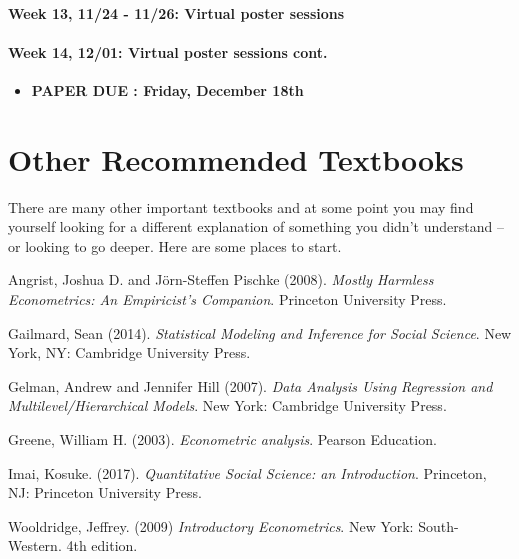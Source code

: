 \documentclass[11pt]{article}
\providecommand{\tightlist}{%
  \setlength{\itemsep}{0pt}\setlength{\parskip}{0pt}}
\begin{document}
\paragraph{Week 13, 11/24 - 11/26: Virtual poster sessions}

\paragraph{Week 14, 12/01: Virtual poster sessions cont.}

\begin{itemize}
\tightlist
    \item 
  \textbf{PAPER DUE : Friday, December 18th}
\end{itemize}

\section*{Other Recommended Textbooks}

There are many other important textbooks and at some point you may find
yourself looking for a different explanation of something you didn't
understand -- or looking to go deeper. Here are some places to start.

Angrist, Joshua D. and Jörn-Steffen Pischke (2008).
\emph{Mostly Harmless Econometrics: An Empiricist's Companion}.
Princeton University Press. 

Gailmard, Sean (2014).
\emph{Statistical Modeling and Inference for Social Science}. New York,
NY: Cambridge University Press.

Gelman, Andrew and Jennifer Hill (2007).
\emph{Data Analysis Using Regression and
Multilevel/Hierarchical Models}. New York: Cambridge University Press.

Greene, William H. (2003). \emph{Econometric analysis}. Pearson
Education.

Imai, Kosuke. (2017). \emph{Quantitative Social Science: an Introduction}. Princeton, NJ: Princeton University Press.

Wooldridge, Jeffrey. (2009) \emph{Introductory Econometrics}. New York: South-Western. 4th edition.
\end{document}
